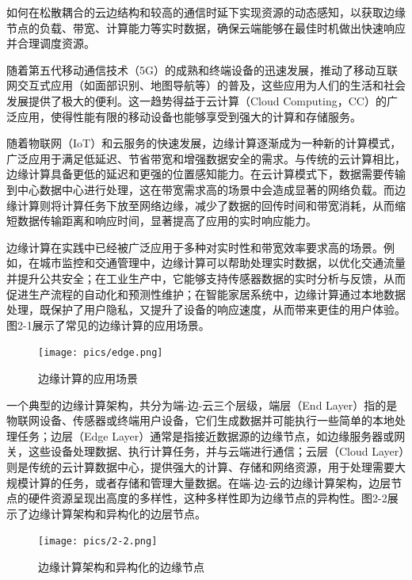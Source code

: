 \item[3.] 如何在松散耦合的云边结构和较高的通信时延下实现资源的动态感知，以获取边缘节点的负载、带宽、计算能力等实时数据，确保云端能够在最佳时机做出快速响应并合理调度资源。

随着第五代移动通信技术（5G）的成熟和终端设备的迅速发展，推动了移动互联网交互式应用（如面部识别、地图导航等）的普及，这些应用为人们的生活和社会发展提供了极大的便利。这一趋势得益于云计算（Cloud Computing，CC）的广泛应用，使得性能有限的移动设备也能够享受到强大的计算和存储服务\cite{shafi20175g,zhang2010cloud}。

随着物联网（IoT）和云服务的快速发展，边缘计算逐渐成为一种新的计算模式，广泛应用于满足低延迟、节省带宽和增强数据安全的需求\cite{shi2016edge}。与传统的云计算相比，边缘计算具备更低的延迟和更强的位置感知能力\cite{mao2017survey,liu2019survey}。在云计算模式下，数据需要传输到中心数据中心进行处理，这在带宽需求高的场景中会造成显著的网络负载。而边缘计算则将计算任务下放至网络边缘，减少了数据的回传时间和带宽消耗，从而缩短数据传输距离和响应时间，显著提高了应用的实时响应能力\cite{shi2016edge,varghese2016challenges,khan2019edge}。

边缘计算在实践中已经被广泛应用于多种对实时性和带宽效率要求高的场景。例如，在城市监控和交通管理中，边缘计算可以帮助处理实时数据，以优化交通流量并提升公共安全\cite{yu2017survey}；在工业生产中，它能够支持传感器数据的实时分析与反馈，从而促进生产流程的自动化和预测性维护\cite{liu2019survey}；在智能家居系统中，边缘计算通过本地数据处理，既保护了用户隐私，又提升了设备的响应速度，从而带来更佳的用户体验\cite{yu2017survey}。图2-1展示了常见的边缘计算的应用场景。

\begin{figure}
    \centering
    \texttt{[image: pics/edge.png]}
    \caption{边缘计算的应用场景}
    \label{fig:my_label}
\end{figure}

一个典型的边缘计算架构，共分为端-边-云三个层级，端层（End Layer）指的是物联网设备、传感器或终端用户设备，它们生成数据并可能执行一些简单的本地处理任务；边层（Edge Layer）通常是指接近数据源的边缘节点，如边缘服务器或网关，这些设备处理数据、执行计算任务，并与云端进行通信；云层（Cloud Layer）则是传统的云计算数据中心，提供强大的计算、存储和网络资源，用于处理需要大规模计算的任务，或者存储和管理大量数据。在端-边-云的边缘计算架构，边层节点的硬件资源呈现出高度的多样性，这种多样性即为边缘节点的异构性\cite{shi2016edge,yu2017survey}。图2-2展示了边缘计算架构和异构化的边层节点。

\begin{figure}[ht]
  \centering
  \texttt{[image: pics/2-2.png]}
  \caption{边缘计算架构和异构化的边缘节点}
  \label{fig:my_label}
\end{figure}

